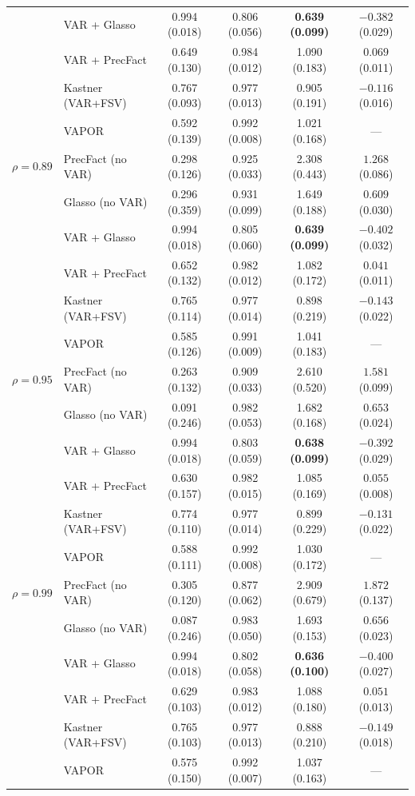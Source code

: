 \begin{table}[h!]
\begin{tabular}{llcccc}
              & VAR + Glasso       & 0.994 (0.018) & 0.806 (0.056) & \textbf{0.639 (0.099)} & $-0.382$ (0.029) \\
              & VAR + PrecFact     & 0.649 (0.130) & 0.984 (0.012) & 1.090 (0.183) & $0.069$ (0.011) \\
              & Kastner (VAR+FSV)  & 0.767 (0.093) & 0.977 (0.013) & 0.905 (0.191) & $-0.116$ (0.016) \\
              & VAPOR              & 0.592 (0.139) & 0.992 (0.008) & 1.021 (0.168) & --- \\
\midrule
$\rho = 0.89$ & PrecFact (no VAR)  & 0.298 (0.126) & 0.925 (0.033) & 2.308 (0.443) & $1.268$ (0.086) \\
              & Glasso (no VAR)    & 0.296 (0.359) & 0.931 (0.099) & 1.649 (0.188) & $0.609$ (0.030) \\
              & VAR + Glasso       & 0.994 (0.018) & 0.805 (0.060) & \textbf{0.639 (0.099)} & $-0.402$ (0.032) \\
              & VAR + PrecFact     & 0.652 (0.132) & 0.982 (0.012) & 1.082 (0.172) & $0.041$ (0.011) \\
              & Kastner (VAR+FSV)  & 0.765 (0.114) & 0.977 (0.014) & 0.898 (0.219) & $-0.143$ (0.022) \\
              & VAPOR              & 0.585 (0.126) & 0.991 (0.009) & 1.041 (0.183) & --- \\
\midrule
$\rho = 0.95$ & PrecFact (no VAR)  & 0.263 (0.132) & 0.909 (0.033) & 2.610 (0.520) & $1.581$ (0.099) \\
              & Glasso (no VAR)    & 0.091 (0.246) & 0.982 (0.053) & 1.682 (0.168) & $0.653$ (0.024) \\
              & VAR + Glasso       & 0.994 (0.018) & 0.803 (0.059) & \textbf{0.638 (0.099)} & $-0.392$ (0.029) \\
              & VAR + PrecFact     & 0.630 (0.157) & 0.982 (0.015) & 1.085 (0.169) & $0.055$ (0.008) \\
              & Kastner (VAR+FSV)  & 0.774 (0.110) & 0.977 (0.014) & 0.899 (0.229) & $-0.131$ (0.022) \\
              & VAPOR              & 0.588 (0.111) & 0.992 (0.008) & 1.030 (0.172) & --- \\
\midrule
$\rho = 0.99$ & PrecFact (no VAR)  & 0.305 (0.120) & 0.877 (0.062) & 2.909 (0.679) & $1.872$ (0.137) \\
              & Glasso (no VAR)    & 0.087 (0.246) & 0.983 (0.050) & 1.693 (0.153) & $0.656$ (0.023) \\
              & VAR + Glasso       & 0.994 (0.018) & 0.802 (0.058) & \textbf{0.636 (0.100)} & $-0.400$ (0.027) \\
              & VAR + PrecFact     & 0.629 (0.103) & 0.983 (0.012) & 1.088 (0.180) & $0.051$ (0.013) \\
              & Kastner (VAR+FSV)  & 0.765 (0.103) & 0.977 (0.013) & 0.888 (0.210) & $-0.149$ (0.018) \\
              & VAPOR              & 0.575 (0.150) & 0.992 (0.007) & 1.037 (0.163) & --- \\
\bottomrule
\end{tabular}
\end{table}

